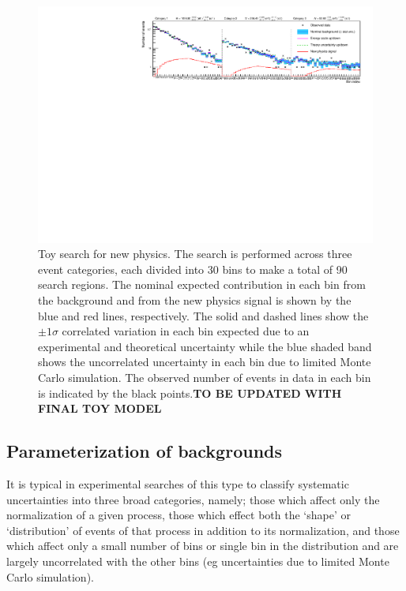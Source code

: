 \documentclass[11pt]{article}
\begin{document}
\begin{figure}[hbt!]
\begin{center}
\includegraphics[scale=0.8]{figures/t}
\end{center}
\caption{Toy search for new physics. The search is performed across three event categories, each divided into 30 bins to make a total of 90 search regions. The nominal expected contribution in each bin from the
background and from the new physics signal is shown by the blue and red lines, respectively. The solid and dashed lines show the $\pm1\sigma$ correlated variation in each bin expected due to an experimental and theoretical
uncertainty while the blue shaded band shows the uncorrelated uncertainty in each bin due to limited Monte Carlo simulation. The observed number of events in data in each bin is indicated by the black points.\textbf{TO BE UPDATED WITH FINAL TOY MODEL}}
\label{fig:toy}
\end{figure}


\subsection{Parameterization of backgrounds}

It is typical in experimental searches of this type to classify systematic uncertainties into three broad categories, namely; those which affect only the normalization of a given process, those which effect both the
`shape' or `distribution' of events of that process in addition to its normalization, and those which affect only a small number of bins or single bin in the distribution and are largely uncorrelated with the other
bins (eg uncertainties due to limited Monte Carlo simulation).
\end{document}
